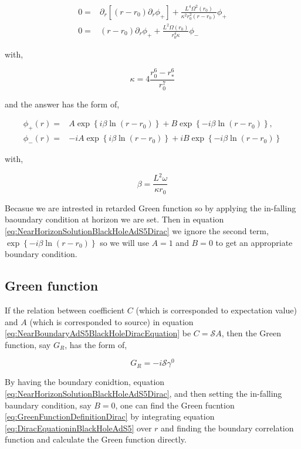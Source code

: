 \begin{align}
    0 =& \partial_r\left[(r-r_0)\partial_r\phi_{+}\right] + \frac{L^4\Omega^2(r_0)}{\kappa^2r_0^2(r-r_0)}\phi_{+}\nonumber\\
    0 =&  (r-r_0) \partial_r \phi_{+} +  \frac{L^2\Omega(r_0)}{r_0^4\kappa} \phi_{-}
\end{align}

with,

\begin{equation}
   \kappa = 4\frac{r_0^6 - r_*^6}{r_0^7}
\end{equation}

and the answer has the form of,

\begin{align} \label{eq:NearHorizonSolutionBlackHoleAdS5Dirac}
   \phi_{+}(r) =& A\exp\left\{i\beta\ln{(r-r_0)}\right\} + B\exp\left\{-i\beta\ln{(r-r_0)}\right\}, \nonumber\\
   \phi_{-}(r) =&-iA\exp\left\{i\beta\ln{(r-r_0)}\right\} + iB\exp\left\{-i\beta\ln{(r-r_0)}\right\}
\end{align}

with,

\begin{equation}
   \beta = \frac{L^2\omega}{\kappa r_0}
\end{equation}

Becasue we are intrested in retarded Green function so by applying the in-falling baoundary condition at horizon we are set. Then in equation \ref{eq:NearHorizonSolutionBlackHoleAdS5Dirac} we ignore the second term, $\exp\left\{-i\beta\ln{(r-r_0)}\right\}$ so we will use $A=1$ and $B=0$ to get an appropriate boundary condition. 

\subsection{Green function}

If the relation between coefficient $C$ (which is corresponded to expectation value) and $A$ (which is corresponded to source) in equation \ref{eq:NearBoundaryAdS5BlackHoleDiracEquation} be $C=\mathcal{S}A$, then the Green function, say $G_R$, has the form of,

\begin{equation} \label{eq:GreenFunctionDefinitionDirac}
   G_R = -i\mathcal{S}\gamma^0
\end{equation}  

By having the boundary conidtion, equation \ref{eq:NearHorizonSolutionBlackHoleAdS5Dirac}, and then setting the in-falling baundary condition, say $B=0$, one can find the Green fucntion \ref{eq:GreenFunctionDefinitionDirac} by integrating equation \ref{eq:DiracEquationinBlackHoleAdS5} over $r$ and finding the boundary correlation function and calculate the Green function directly. 

